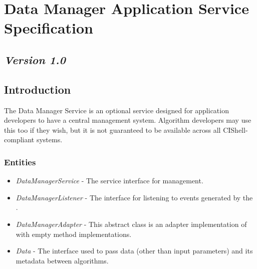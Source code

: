 %

\chapter{Data Manager Application Service Specification}

\section*{\textit{Version 1.0}}

\section{Introduction}

The Data Manager Service is an optional service designed for application
developers to have a central  management system. Algorithm
developers may use this too if they wish, but it is not guaranteed to be
available across all CIShell-compliant systems.

\subsection{Entities}

\begin{itemize}
  \item \textit{DataManagerService} - The service interface for 
  management.
  \item \textit{DataManagerListener} - The interface for listening to events
  generated by the .
  \item \textit{DataManagerAdapter} - This abstract class is an adapter
  implementation of  with empty method
  implementations.
  \item \textit{Data} - The interface used to pass data (other than
  input parameters) and its metadata between algorithms.
\end{itemize}

\orgcishellappservicedatamanager{}